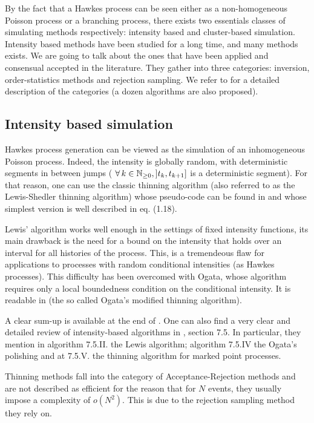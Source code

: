 By the fact that a Hawkes process can be seen either as a non-homogeneous Poisson process or a branching process, there exists two essentials classes of simulating methods respectively: intensity based and cluster-based simulation. Intensity based methods have been studied for a long time, and many methods exists. We are going to talk about the ones that have been applied and consensual accepted in the literature. They gather into three categories: inversion, order-statistics methods and rejection sampling. We refer to \cite{gen_nonhomo_poisson} for a detailed description of the categories (a dozen algorithms are also proposed).



\subsection{Intensity based simulation}
\label{subsection:thinning}
Hawkes process generation can be viewed as the simulation of an inhomogeneous Poisson process. Indeed, the intensity is globally random, with deterministic segments in between jumps ( $\forall k \in \N, ]t_k, t_{k+1}]$ is a deterministic segment). For that reason, one can use the classic thinning algorithm (also referred to as the Lewis-Shedler thinning algorithm) whose pseudo-code can be found in \cite{lewis} and whose simplest version is well described in \cite{socialhawkes} eq. (1.18). 

Lewis' algorithm works well enough in the settings of fixed intensity functions, its main drawback is the need for a bound on the intensity that holds over an interval for all histories of the process. This, is a tremendeous flaw for applications to processes with random conditional intensities (as Hawkes processes). This difficulty has been overcomed with Ogata, whose algorithm requires only a local boundedness condition on the conditional intensity.
It is readable in \cite{Ogata} (the so called Ogata's modified thinning algorithm). 


A clear sum-up is available at the end of \cite{simullaub}. One can also find a very clear and detailed review of intensity-based algorithms in \cite{daley}, section 7.5. In particular, they mention in algorithm 7.5.II. the Lewis algorithm; algorithm 7.5.IV the Ogata's polishing and at 7.5.V. the thinning algorithm for marked point processes. 

Thinning methods fall into the category of Acceptance-Rejection methods and are not described as efficient for the reason that for $N$ events, they usually impose a complexity of $o(N^2)$. This is due to the rejection sampling method they rely on.


